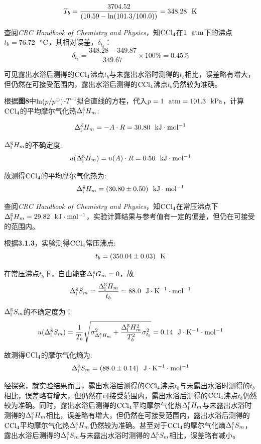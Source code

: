 \documentclass[12pt]{article}
\begin{document}
		$$
			T_{b}=\frac{3704.52}{(10.59-{\rm ln}(101.3/100.0))}=348.28\ \ {\rm K}
		$$
		\par
		查阅\textit{CRC Handbook of Chemistry and Physics}\citealp{crc}，知$\rm CCl_{4}$在$\rm 1\ \ atm$下的沸点$t_{b}=76.72\ \ {\rm ^{\circ}C}$，其相对误差，$\delta_{t_{b}}$：
		$$
			\delta_{t_{b}}=\frac{348.28-349.87}{349.67}\times 100\%  = 0.45\%
		$$
		\par
		可见露出水浴后测得的$\rm CCl_{4}$沸点$t_{b}$与未露出水浴时测得的$t_{b}$相比，误差略有增大，但仍然在可接受范围内，露出水浴后测得的$\rm CCl_{4}$沸点$t_{b}$仍然较为准确。
		\par
		根据\textbf{图8}中${\rm ln}(p/p^{\ominus})$-$T^{-1}$拟合直线的方程，代入$p=1\ \ {\rm atm}=101.3\ \ {\rm kPa}$，计算$\rm CCl_{4}$的平均摩尔气化热$\Delta^{\rm g}_{\rm l}H_{m}$:\par
		$$
			\Delta^{\rm g}_{\rm l}H_{m}=-A\cdot R=30.80\ \ {\rm kJ\cdot mol^{-1}}
		$$
		\par
		$\Delta^{\rm g}_{\rm l}H_{m}$的不确定度:
		$$
			u(\Delta^{\rm g}_{\rm l}H_{m})=u(A)\cdot R=0.50\ \ {\rm kJ\cdot mol^{-1}}
		$$
		\par
		故测得$\rm CCl_{4}$的平均摩尔气化热为:
		$$
			\Delta^{\rm g}_{\rm l}H_{m}=(30.80\pm 0.50)\ \ {\rm kJ\cdot mol^{-1}}
		$$
		\par
		查阅\textit{CRC Handbook of Chemistry and Physics}\citealp{crc}，知$\rm CCl_{4}$在常压沸点下$\Delta^{\rm g}_{\rm l}H_{m}=29.82\ \ {\rm kJ\cdot mol^{-1}}$，实验计算结果与参考值有一定的偏差，但仍在可接受的范围内。
		\par
		根据\textbf{3.1.3}，实验测得$\rm CCl_{4}$常压沸点:
		$$
			t_{b}=(350.04\pm 0.03)\ \ {\rm K}
		$$
		\par
		在常压沸点$t_{b}$下，自由能变$\Delta^{\rm g}_{\rm l}G_{m}=0$，故
		$$
			\Delta^{\rm g}_{\rm l}S_{m}=\frac{\Delta^{\rm g}_{\rm l}H_{m}}{t_{b}}=88.0\ \ {\rm J\cdot K^{-1}\cdot mol^{-1}}
		$$
		\par
		$\Delta^{\rm g}_{\rm l}S_{m}$的不确定度为：
		$$
			u(\Delta^{\rm g}_{\rm l}S_{m})=\frac{1}{T_{b}} \sqrt{\sigma^{2}_{\Delta^{\rm g}_{\rm l}H_{m}}+\frac{\Delta^{\rm g}_{\rm l}H_{m}^{2}}{T_{b}^{2}}\sigma^{2}_{t_{b}}}=0.14\ \ {\rm J\cdot K^{-1}\cdot mol^{-1}}
		$$
		\par
		故测得$\rm CCl_{4}$的摩尔气化熵为:
		$$
			\Delta^{\rm g}_{\rm l}S_{m}=(88.0\pm 0.14)\ \ {\rm J\cdot K^{-1}\cdot mol^{-1}}
		$$
		\par
		经探究，就实验结果而言，露出水浴后测得的$\rm CCl_{4}$沸点$t_{b}$与未露出水浴时测得的$t_{b}$相比，误差略有增大，但仍然在可接受范围内，露出水浴后测得的$\rm CCl_{4}$沸点$t_{b}$仍然较为准确。同时，露出水浴后测得的$\rm CCl_{4}$平均摩尔气化热$\Delta^{\rm g}_{\rm l}H_{m}$与未露出水浴时测得的$\Delta^{\rm g}_{\rm l}H_{m}$相比，误差略有增大，但仍然在可接受范围内，露出水浴后测得的$\rm CCl_{4}$平均摩尔气化热$\Delta^{\rm g}_{\rm l}H_{m}$仍然较为准确。甚至对于$\rm CCl_{4}$的摩尔气化熵$\Delta^{\rm g}_{\rm l}S_{m}$，露出水浴后测得的$\Delta^{\rm g}_{\rm l}S_{m}$与未露出水浴时测得的$\Delta^{\rm g}_{\rm l}S_{m}$相比，误差略有减小。
\end{document}
